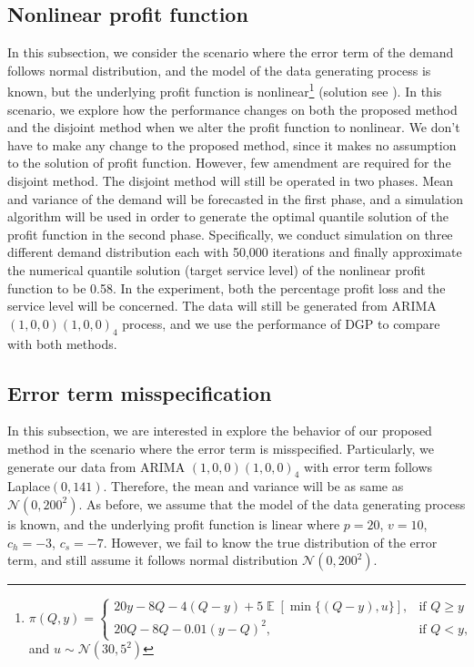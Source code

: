 \documentclass{article}
\DeclareMathOperator{\E}{\mathbb{E}}
\begin{document}
\subsection{Nonlinear profit function}
In this subsection, we consider the scenario where the error term of the demand follows normal distribution, and the model of the data generating process is known, but the underlying profit function is nonlinear\footnote{$
        \pi(Q,y)=
        \begin{cases}
            20y-8Q-4(Q-y)+5\E[\min \{(Q-y),u\}],& \text{if } Q\geq y\\
            20Q-8Q-0.01(y-Q)^2,& \text{if } Q< y,
        \end{cases}$ and $u\sim \mathcal{N}(30,5^2)$} (solution see \cite{KK18}).
In this scenario, we explore how the performance changes on both the proposed method and the disjoint method when we alter the profit function to nonlinear. We don't have to make any change to the proposed method, since it makes no assumption to the solution of profit function. However, few amendment are required for the disjoint method. The disjoint method will still be operated in two phases. Mean and variance of the demand will be forecasted in the first phase, and a simulation algorithm will be used in order to generate the optimal quantile solution of the profit function in the second phase. Specifically, we conduct simulation on three different demand distribution each with 50,000 iterations and finally approximate the numerical quantile solution (target service level) of the nonlinear profit function to be 0.58. In the experiment, both the percentage profit loss and the service level will be concerned. The data will still be generated from ARIMA $(1,0,0)(1,0,0)_4$ process, and we use the performance of DGP to compare with both methods. 

\subsection{Error term misspecification}
In this subsection, we are interested in explore the behavior of our proposed method in the scenario where the error term is misspecified. Particularly, we generate our data from ARIMA $(1,0,0)(1,0,0)_4$ with error term follows Laplace$(0,141)$. Therefore, the mean and variance will be as same as $\mathcal{N}(0,200^2)$. As before, we assume that the model of the data generating process is known, and the underlying profit function is linear where $p=20$, $v=10$, $c_h=-3$, $c_s=-7$. However, we fail to know the true distribution of the error term, and still assume it follows normal distribution $\mathcal{N}(0,200^2)$.
\end{document}
